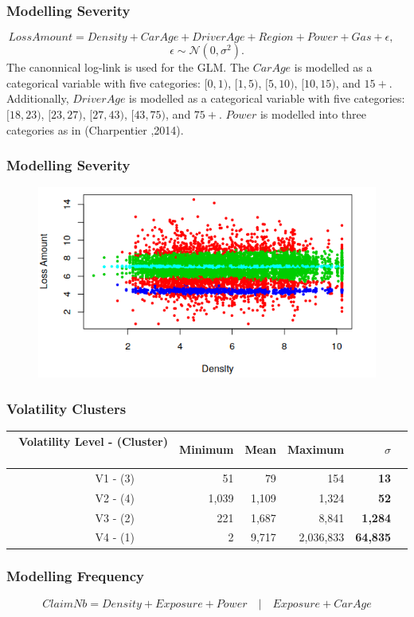 \documentclass{beamer}
\begin{document}
\begin{frame}
\frametitle{Modelling Severity}
$$ Loss Amount =  Density + Car Age + Driver Age + Region + Power + Gas + \epsilon, \quad $$
$$ 
\epsilon \sim \mathcal{N}(0,\sigma^2). 
$$ \newline
The canonnical log-link is used for the GLM. The
$CarAge$ is modelled as a categorical variable with five categories: $[0,1)$, $[1,5)$, $[5,10)$, $[10,15)$, and $15+$. Additionally, $DriverAge$ is modelled as a categorical variable with five categories: $[18,23)$, $[23,27)$, $[27,43)$, $[43,75)$, and $75+$. $Power$ is modelled into three categories as in (Charpentier ,2014).

\end{frame}

\begin{frame}
\frametitle{Modelling Severity}
\begin{figure}[!htb]
\label{fig:vet1}
\begin{center}
\includegraphics[scale=0.83]{SeverityPlot}
\end{center}
\end{figure}
\end{frame}

\begin{frame}
\frametitle{Volatility Clusters}
\begin{tabular}{rrrrrr}
\hline\hline
Volatility Level - (Cluster)  $\quad$    & Minimum & Mean  & Maximum & $\sigma$    \\
\hline
V1 - (3)$\quad\quad\quad$ & 51  & 79 & 154 & \textbf{ 13} \\
V2 - (4)$\quad\quad\quad$ & 1,039  & 1,109  &  1,324 & \textbf{ 52} \\
V3 - (2)$\quad\quad\quad$ & 221 & 1,687  & 8,841  &\textbf{ 1,284}  \\
V4 - (1)$\quad\quad\quad$ & 2 & 9,717 & 2,036,833  & \textbf{ 64,835}   \\
\hline\hline
\end{tabular}
\end{frame}
\begin{frame}
\frametitle{Modelling Frequency}
\begin{equation}
Claim Nb = Density + Exposure + Power \quad|\quad Exposure + Car Age
\end{equation}
\end{frame}
\end{document}
